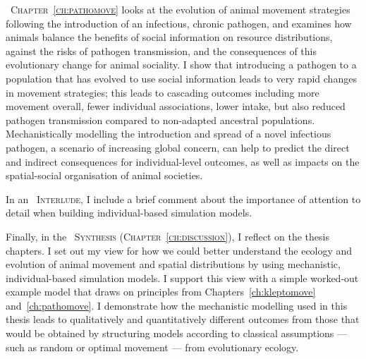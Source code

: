 {\scshape~Chapter~\ref{ch:pathomove}} looks at the evolution of animal movement strategies following the introduction of an infectious, chronic pathogen, and examines how animals balance the benefits of social information on resource distributions, against the risks of pathogen transmission, and the consequences of this evolutionary change for animal sociality.
I show that introducing a pathogen to a population that has evolved to use social information leads to very rapid changes in movement strategies; this leads to cascading outcomes including more movement overall, fewer individual associations, lower intake, but also reduced pathogen transmission compared to non-adapted ancestral populations.
Mechanistically modelling the introduction and spread of a novel infectious pathogen, a scenario of increasing global concern, can help to predict the direct and indirect consequences for individual-level outcomes, as well as impacts on the spatial-social organisation of animal societies.

In an {\scshape~Interlude}, I include a brief comment about the importance of attention to detail when building individual-based simulation models.

\medskip

Finally, in the {\scshape~Synthesis (Chapter~\ref{ch:discussion})}, I reflect on the thesis chapters.
I set out my view for how we could better understand the ecology and evolution of animal movement and spatial distributions by using mechanistic, individual-based simulation models.
I support this view with a simple worked-out example model that draws on principles from Chapters~\ref{ch:kleptomove} and~\ref{ch:pathomove}.
I demonstrate how the mechanistic modelling used in this thesis leads to qualitatively and quantitatively different outcomes from those that would be obtained by structuring models according to classical assumptions --- such as random or optimal movement --- from evolutionary ecology.


\endgroup

{ \begin{center}  \end{center} }

\vfill

\cleardoublepage
